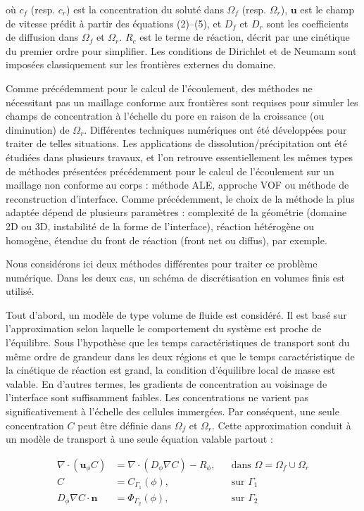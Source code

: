\documentclass[12pt,a4paper]{report}
\begin{document}
où $c_f$ (resp. $c_r$) est la concentration du soluté dans $\Omega_f$ 
(resp. $\Omega_r$), $\mathbf{u}$ est le champ de vitesse prédit à partir 
des équations (2)--(5), et $D_f$ et $D_r$ sont les coefficients de diffusion 
dans $\Omega_f$ et $\Omega_r$. $R_c$ est le terme de réaction, décrit par 
une cinétique du premier ordre pour simplifier. Les conditions de Dirichlet 
et de Neumann sont imposées classiquement sur les frontières externes du domaine.

Comme précédemment pour le calcul de l'écoulement, des méthodes ne nécessitant 
pas un maillage conforme aux frontières sont requises pour simuler les champs 
de concentration à l'échelle du pore en raison de la croissance (ou diminution) 
de $\Omega_r$. Différentes techniques numériques ont été développées pour 
traiter de telles situations.
Les applications de dissolution/précipitation ont été étudiées dans plusieurs travaux, et l’on retrouve essentiellement les mêmes types de méthodes présentées précédemment pour le calcul de l’écoulement sur un maillage non conforme au corps : méthode ALE, approche VOF ou méthode de reconstruction d’interface. Comme précédemment, le choix de la méthode la plus adaptée dépend de plusieurs paramètres : complexité de la géométrie (domaine 2D ou 3D, instabilité de la forme de l’interface), réaction hétérogène ou homogène, étendue du front de réaction (front net ou diffus), par exemple.

Nous considérons ici deux méthodes différentes pour traiter ce problème numérique. Dans les deux cas, un schéma de discrétisation en volumes finis est utilisé.

Tout d’abord, un modèle de type volume de fluide est considéré. Il est basé sur l’approximation selon laquelle le comportement du système est proche de l’équilibre. Sous l’hypothèse que les temps caractéristiques de transport sont du même ordre de grandeur dans les deux régions et que le temps caractéristique de la cinétique de réaction est grand, la condition d’équilibre local de masse est valable. En d’autres termes, les gradients de concentration au voisinage de l’interface sont suffisamment faibles. Les concentrations ne varient pas significativement à l’échelle des cellules immergées. Par conséquent, une seule concentration $C$ peut être définie dans $\Omega_f$ et $\Omega_r$. Cette approximation conduit à un modèle de transport à une seule équation valable partout :

\begin{align}
\nabla \cdot (\mathbf{u}_{\phi} C) &= \nabla \cdot (D_{\phi} \nabla C) - R_{\phi},
&& \text{dans } \Omega = \Omega_f \cup \Omega_r \tag{42} \\
C &= C_{\Gamma_1}(\phi),
&& \text{sur } \Gamma_1 \tag{43} \\
D_{\phi}\nabla C \cdot \mathbf{n} &= \Phi_{\Gamma_2}(\phi),
&& \text{sur } \Gamma_2 \tag{44}
\end{align}
\end{document}
